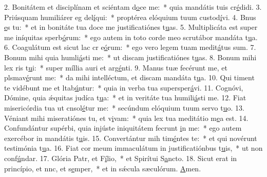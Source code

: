 2. Bonitátem et disciplínam et sciéntam d\uline{o}ce me:~* quia mandátis tuis cr\uline{é}didi.
3. Priúsquam humiliárer eg del\uline{í}qui:~* proptérea elóquium tuum custod\uline{í}vi.
4. Bnus \uline{e}s tu:~* et in bonitáte tua doce me justificatiónes t\uline{u}as.
5. Multiplicáta est super me iníquitas sperb\uline{ó}rum:~* ego autem in toto corde meo scrutábor mandáta t\uline{u}a.
6. Coagulátum est sicut lac cr e\uline{ó}rum:~* ego vero legem tuam medit\uline{á}tus sum.
7. Bonum mihi quia humli\uline{á}sti me:~* ut discam justificatiónes t\uline{u}as.
8. Bonum mihi lex ris t\uline{u}i:~* super míllia auri et arg\uline{é}nti.
9. Manus tuæ fecérunt me, et plsmav\uline{é}runt me:~* da mihi intelléctum, et discam mandáta t\uline{u}a.
10. Qui timent te vidébunt me et ltab\uline{ú}ntur:~* quia in verba tua supersper\uline{á}vi.
11. Cognóvi, Dómine, quia ǽquitas judíca t\uline{u}a:~* et in veritáte tua humili\uline{á}sti me.
12. Fiat misericórdia tua ut cnsol\uline{é}tur me:~* secúndum elóquium tuum servo t\uline{u}o.
13. Véniant mihi miseratiónes tu, et v\uline{i}vam:~* quia lex tua meditátio m\uline{e}a est.
14. Confundántur supérbi, quia injúste iniquitátem fecrunt \uline{i}n me:~* ego autem exercébor in mandátis t\uline{u}is.
15. Convertántur mih tim\uline{é}ntes te:~* et qui novérunt testimónia t\uline{u}a.
16. Fiat cor meum immaculátum in justificatiónbus t\uline{u}is,~* ut non conf\uline{ú}ndar.
17. Glória Patr, et F\uline{í}lio,~* et Spirítui S\uline{a}ncto.
18. Sicut erat in princípio, et nnc, et s\uline{e}mper,~* et in sǽcula sæculórum. \uline{A}men.
